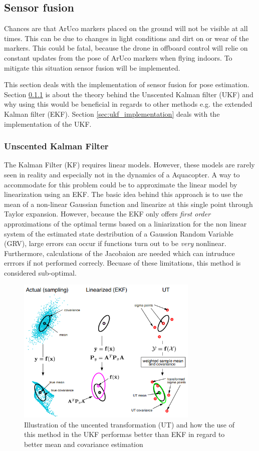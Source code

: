 \documentclass[../Head/report.tex]{subfiles}
\begin{document}
\subsection{Sensor fusion}
\label{sec:sensor_fusion}
Chances are that ArUco markers placed on the ground will not be visible at all times. This can be due to changes in light conditions and dirt on or wear of the markers. This could be fatal, because the drone in offboard control will relie on constant updates from the pose of ArUco markers when flying indoors. To mitigate this situation sensor fusion will be implemented. 

This section deals with the implementation of sensor fusion for pose estimation. Section \ref{sec:ukf} is about the theory behind the Unscented Kalman filter (UKF) and why using this would be beneficial in regards to other methods e.g. the extended Kalman filter (EKF). Section \ref{sec:ukf_implementation} deals with the implementation of the UKF.   

\subsubsection{Unscented Kalman Filter}
\label{sec:ukf}

The Kalman Filter (KF) requires linear models. However, these models are rarely seen in reality and especially not in the dynamics of a Aquacopter. A way to accommodate for this problem could be to approximate the linear model by linearization using an EKF. The basic idea behind this approach is to use the mean of a non-linear Gaussian function and linearize at this single point through Taylor expansion. However, because the EKF only offers \textit{first order} approximations of the optimal terms based on a liniarization for the non linear system of the estimated state destribution of a Gaussion Random Variable (GRV), large errors can occur if functions turn out to be \textit{very} nonlinear. Furthermore, calculations of the Jacobaion are needed which can intruduce errrors if not performed correcly. Becuase of these limitations, this method is considered sub-optimal.  

\begin{figure}[H]
	\centering
	\includegraphics[height=7.0cm]{../Figures/ukf.png}
	\caption{Illustration of the uncented transformation (UT) and how the use of this method in the UKF performas better than EKF in regard to better mean and covariance estimation \cite{UnscentedKalmanFilter}} \label{fig:ut}
\end{figure}
\end{document}
